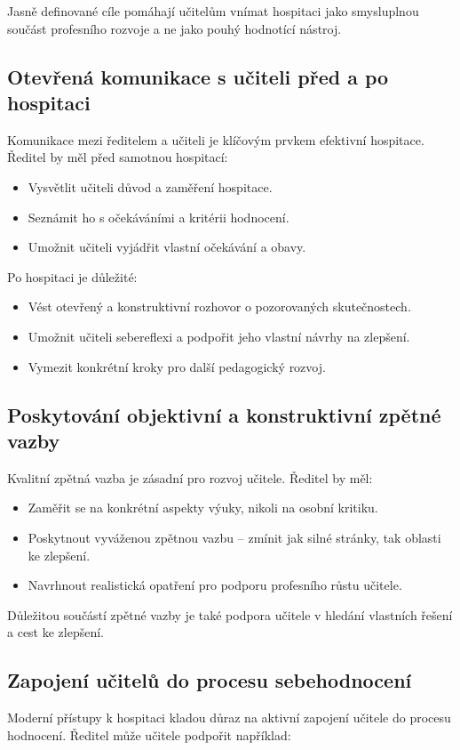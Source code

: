 Jasně definované cíle pomáhají učitelům vnímat hospitaci jako smysluplnou součást profesního rozvoje a ne jako pouhý hodnotící nástroj.

\subsection{Otevřená komunikace s učiteli před a po hospitaci}
Komunikace mezi ředitelem a učiteli je klíčovým prvkem efektivní hospitace. Ředitel by měl před samotnou hospitací:

\begin{itemize}
    \item Vysvětlit učiteli důvod a zaměření hospitace.
    \item Seznámit ho s očekáváními a kritérii hodnocení.
    \item Umožnit učiteli vyjádřit vlastní očekávání a obavy.
\end{itemize}

Po hospitaci je důležité:

\begin{itemize}
    \item Vést otevřený a konstruktivní rozhovor o pozorovaných skutečnostech.
    \item Umožnit učiteli sebereflexi a podpořit jeho vlastní návrhy na zlepšení.
    \item Vymezit konkrétní kroky pro další pedagogický rozvoj.
\end{itemize}

\subsection{Poskytování objektivní a konstruktivní zpětné vazby}
Kvalitní zpětná vazba je zásadní pro rozvoj učitele. Ředitel by měl:

\begin{itemize}
    \item Zaměřit se na konkrétní aspekty výuky, nikoli na osobní kritiku.
    \item Poskytnout vyváženou zpětnou vazbu – zmínit jak silné stránky, tak oblasti ke zlepšení.
    \item Navrhnout realistická opatření pro podporu profesního růstu učitele.
\end{itemize}

Důležitou součástí zpětné vazby je také podpora učitele v hledání vlastních řešení a cest ke zlepšení.

\subsection{Zapojení učitelů do procesu sebehodnocení}
Moderní přístupy k hospitaci kladou důraz na aktivní zapojení učitele do procesu hodnocení. Ředitel může učitele podpořit například:

